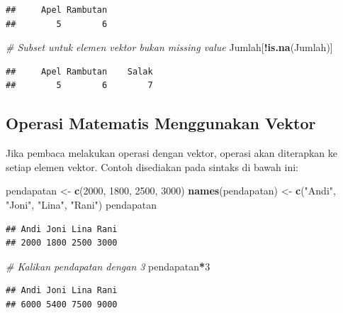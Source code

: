 \documentclass[]{book}
\newenvironment{Shaded}{\begin{snugshade}}{\end{snugshade}}
\newcommand{\KeywordTok}[1]{\textcolor[rgb]{0.13,0.29,0.53}{\textbf{#1}}}
\newcommand{\DecValTok}[1]{\textcolor[rgb]{0.00,0.00,0.81}{#1}}
\newcommand{\StringTok}[1]{\textcolor[rgb]{0.31,0.60,0.02}{#1}}
\newcommand{\CommentTok}[1]{\textcolor[rgb]{0.56,0.35,0.01}{\textit{#1}}}
\newcommand{\OperatorTok}[1]{\textcolor[rgb]{0.81,0.36,0.00}{\textbf{#1}}}
\newcommand{\NormalTok}[1]{#1}
\begin{document}
\begin{verbatim}
##     Apel Rambutan 
##        5        6
\end{verbatim}

\begin{Shaded}
\begin{Highlighting}[]
\CommentTok{# Subset untuk elemen vektor bukan missing value}
\NormalTok{Jumlah[}\OperatorTok{!}\KeywordTok{is.na}\NormalTok{(Jumlah)]}
\end{Highlighting}
\end{Shaded}

\begin{verbatim}
##     Apel Rambutan    Salak 
##        5        6        7
\end{verbatim}

\subsection{Operasi Matematis Menggunakan
Vektor}\label{operasi-matematis-menggunakan-vektor}

Jika pembaca melakukan operasi dengan vektor, operasi akan diterapkan ke
setiap elemen vektor. Contoh disediakan pada sintaks di bawah ini:

\begin{Shaded}
\begin{Highlighting}[]
\NormalTok{pendapatan <-}\StringTok{ }\KeywordTok{c}\NormalTok{(}\DecValTok{2000}\NormalTok{, }\DecValTok{1800}\NormalTok{, }\DecValTok{2500}\NormalTok{, }\DecValTok{3000}\NormalTok{)}
\KeywordTok{names}\NormalTok{(pendapatan) <-}\StringTok{ }\KeywordTok{c}\NormalTok{(}\StringTok{"Andi"}\NormalTok{, }\StringTok{"Joni"}\NormalTok{, }\StringTok{"Lina"}\NormalTok{, }\StringTok{"Rani"}\NormalTok{)}
\NormalTok{pendapatan}
\end{Highlighting}
\end{Shaded}

\begin{verbatim}
## Andi Joni Lina Rani 
## 2000 1800 2500 3000
\end{verbatim}

\begin{Shaded}
\begin{Highlighting}[]
\CommentTok{# Kalikan pendapatan dengan 3}
\NormalTok{pendapatan}\OperatorTok{*}\DecValTok{3}
\end{Highlighting}
\end{Shaded}

\begin{verbatim}
## Andi Joni Lina Rani 
## 6000 5400 7500 9000
\end{verbatim}
\end{document}
